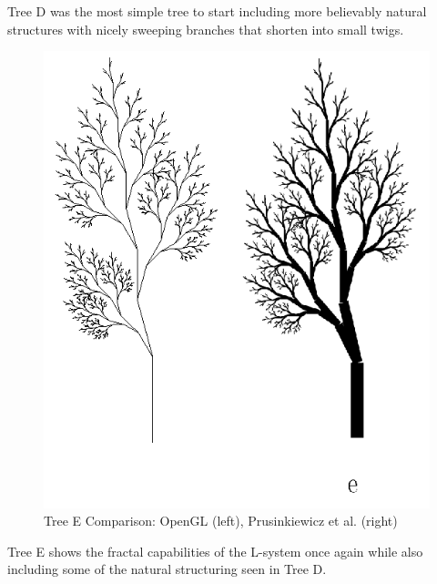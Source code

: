 \documentclass[final]{cmpreport}
\begin{document}
Tree D was the most simple tree to start including more believably natural structures with nicely 
sweeping branches that shorten into small twigs.

\begin{figure}[ht]
    \includegraphics[scale=0.4]{tree-comp-e.png} 
    \centering
    \captionsetup{justification=centering}
    \caption{Tree E Comparison: OpenGL (left), Prusinkiewicz et al. (right)}
    \label{fig:tree-comp-e}
\end{figure}

\pagebreak
Tree E shows the fractal capabilities of the L-system once again while also including some of the 
natural structuring seen in Tree D.
\end{document}
